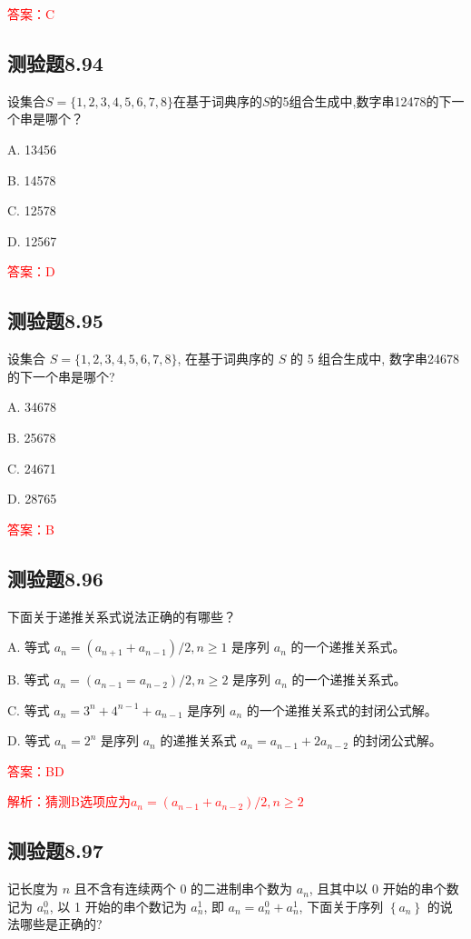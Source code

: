 \documentclass[UTF8, heading=true]{ctexart}
\begin{document}
\textcolor{red}{答案：C}

\subsection{测验题8.94}
设集合$S = \{1,2,3,4,5,6,7,8\}$在基于词典序的$S$的5组合生成中,数字串12478的下一个串是哪个？

A. 13456

B. 14578

C. 12578

D. 12567

\textcolor{red}{答案：D}


\subsection{测验题8.95}

设集合 $S=\{1,2,3,4,5,6,7,8\}$, 在基于词典序的 $S$ 的 5 组合生成中, 数字串24678的下一个串是哪个?

A. 34678

B. 25678

C. 24671

D. 28765

\textcolor{red}{答案：B}

\subsection{测验题8.96}

下面关于递推关系式说法正确的有哪些？

A. 等式 $a_n=\left(a_{n+1}+a_{n-1}\right) / 2, n \geq 1$ 是序列 $a_n$ 的一个递推关系式。

B. 等式 $a_n=\left(a_{n-1}=a_{n-2}\right) / 2, n \geq 2$ 是序列 $a_n$ 的一个递推关系式。

C. 等式 $a_n=3^n+4^{n-1}+a_{n-1}$ 是序列 $a_n$ 的一个递推关系式的封闭公式解。

D. 等式 $a_n=2^n$ 是序列 $a_n$ 的递推关系式 $a_n=a_{n-1}+2 a_{n-2}$ 的封闭公式解。

\textcolor{red}{答案：BD}

\textcolor{red}{解析：猜测B选项应为$a_n=\left(a_{n-1}+a_{n-2}\right) / 2, n \geq 2$}

\subsection{测验题8.97}

记长度为 $n$ 且不含有连续两个 0 的二进制串个数为 $a_n$, 且其中以 0 开始的串个数记为 $a_n^0$, 以 1 开始的串个数记为 $a_n^1$, 即 $a_n=a_n^0+a_n^1$, 下面关于序列 $\left\{a_n\right\}$ 的说法哪些是正确的?
\end{document}

